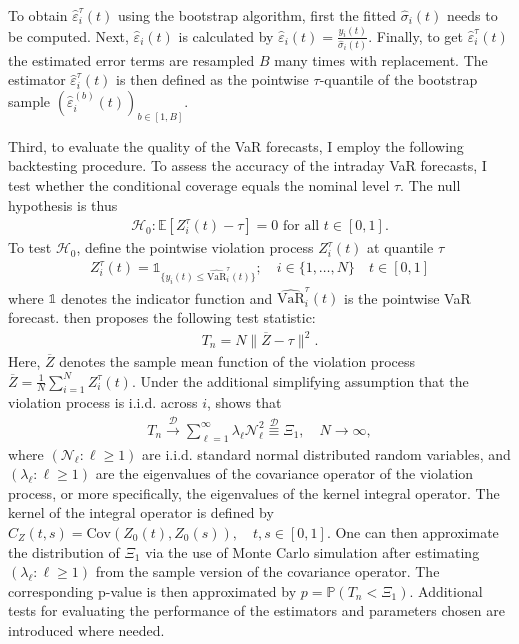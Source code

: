 \documentclass[12pt,a4paper]{article}
\theoremstyle{definition}
\begin{document}
To obtain $\hat{\varepsilon}_i^\tau(t)$ using the bootstrap algorithm, first the fitted $\hat{\sigma}_i(t)$ needs to be computed. Next, $\hat{\varepsilon}_i(t)$ is calculated by $\hat{\varepsilon}_i(t)=\frac{y_i(t)}{\hat{\sigma}_i(t)}$. Finally, to get $\hat{\varepsilon}_i^\tau(t)$ the estimated error terms are resampled $B$ many times with replacement. The estimator $\hat{\varepsilon}_i^\tau(t)$ is then defined as the pointwise $\tau$-quantile of the bootstrap sample $(\hat{\varepsilon}_i^{(b)}(t))_{b\in[1,B]}$.

Third, to evaluate the quality of the VaR forecasts, I employ the following backtesting procedure. To assess the accuracy of the intraday VaR forecasts, I test whether the conditional coverage equals the nominal level $\tau$. The null hypothesis is thus
\begin{gather}
    \mathcal{H}_0 : \mathbb{E}[Z_i^\tau(t)-\tau]= 0 \text{ for all }t\in[0,1].
\end{gather}
To test $\mathcal{H}_0$, define the pointwise violation process $Z_i^\tau(t)$ at quantile $\tau$
\begin{gather}
    Z_i^\tau(t) = \mathds{1}_{\{y_i(t)\leq \widehat{\mathrm{VaR}}_i^\tau(t)\}}; \quad i\in \{1,\dots,N\} \quad t\in[0,1]
\end{gather}
where $\mathds{1}$ denotes the indicator function and $\widehat{\mathrm{VaR}}_i^\tau(t)$ is the pointwise VaR forecast. \citet{RICE20201023} then proposes the following test statistic:
\begin{gather}
    T_n = N \|\overline{Z} - \tau \|^2.
\end{gather}
Here, $\overline{Z}$ denotes the sample mean function of the violation process $\overline{Z}=\frac{1}{N}\sum_{i=1}^NZ_i^\tau(t)$. Under the additional simplifying assumption that the violation process is i.i.d. across $i$, \citet{RICE20201023} shows that
\begin{gather}
    T_n \overset{\mathcal{D}}{\to} \sum_{\ell=1}^\infty \lambda_\ell \mathcal{N}_\ell^2 \overset{\mathcal{D}}{\equiv} \Xi_1, \quad N \to \infty,
\end{gather}
where $(\mathcal{N}_\ell:\ell\geq 1)$ are i.i.d. standard normal distributed random variables, and $(\lambda_\ell:\ell\geq 1)$ are the eigenvalues of the covariance operator of the violation process, or more specifically, the eigenvalues of the kernel integral operator. The kernel of the integral operator is defined by $C_Z(t,s) = \mathrm{Cov}(Z_0(t),Z_0(s)), \quad t,s\in[0,1]$. One can then approximate the distribution of $\Xi_1$ via the use of Monte Carlo simulation after estimating $(\lambda_\ell:\ell\geq 1)$ from the sample version of the covariance operator. The corresponding p-value is then approximated by $p=\mathbb{P}(T_n<\Xi_1)$. Additional tests for evaluating the performance of the estimators and parameters chosen are introduced where needed.
\end{document}
